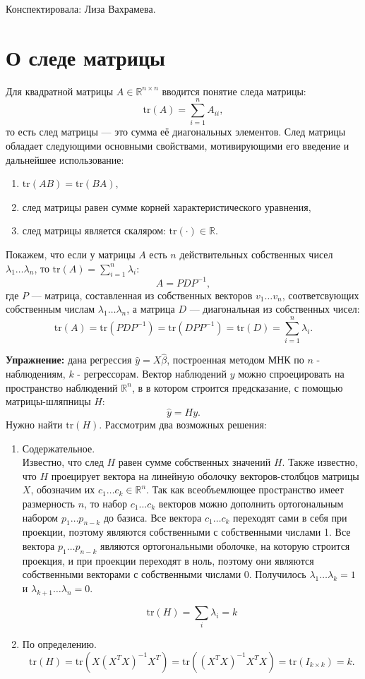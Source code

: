 \documentclass[12pt]{article} %
\theoremstyle{definition} %
\begin{document}
Конспектировала: Лиза Вахрамева.

\section{О следе матрицы}
Для квадратной матрицы $A \in \mathbb{R}^{n \times n}$ вводится понятие следа
матрицы:
$$\text{tr}(A) = \sum_{i=1}^n A_{ii},$$
то есть след матрицы — это сумма её диагональных элементов. След матрицы обладает следующими основными свойствами, мотивирующими его введение и дальнейшее использование:
\begin{enumerate}
    \item $\text{tr}(AB) = \text{tr}(BA)$,
    \item след матрицы равен сумме корней характеристического уравнения,\\
    \item след матрицы является скаляром: $\text{tr}(\cdot) \in \mathbb{R}$.
\end{enumerate}
Покажем, что если у матрицы $A$ есть $n$ действительных собственных чисел
$\lambda_1 \dots \lambda_n$, то $\text{tr}(A) = \sum_{i=1}^n \lambda_i$:
$$A = PDP^{-1},$$
где $P$ — матрица, составленная из собственных векторов $v_1 \dots v_n$, соответсвующих собственным числам $\lambda_1 \dots \lambda_n$, а матрица
$D$ — диагональная из собственных чисел:
$$\text{tr}(A) = \text{tr}(PDP^{-1}) = \text{tr}(D PP^{-1})
= \text{tr}(D) = \sum_{i=1}^n \lambda_i.$$

\textbf{Упражнение:} дана регрессия $\hat{y} = X\hat{\beta}$, построенная методом МНК по $n$ - наблюдениям, $k$ - регрессорам. Вектор наблюдений $y$ можно спроецировать на пространство наблюдений $\mathbb{R}^n$, в в котором строится предсказание, с помощью матрицы-шляпницы $H$:
$$\hat{y} = Hy.$$
Нужно найти $\text{tr}(H)$. Рассмотрим два возможных решения:
\begin{enumerate}
    \item Содержательное. \\
    Известно, что след $H$ равен сумме собственных значений $H$. Также известно, что  $H$ проецирует вектора на линейную оболочку векторов-столбцов матрицы $X$, обозначим их $c_1 \dots c_k \in \mathbb{R}^n$. Так как всеобъемлющее пространство имеет размерность $n$, то набор $c_1 \dots c_k$ векторов можно дополнить ортогональным набором $p_1 \dots p_{n-k}$ до базиса. Все вектора $c_1 \dots c_k$ переходят сами в себя при проекции, поэтому являются собственными с собственными числами 1. Все вектора $p_1 \dots p_{n-k}$
    являются ортогональными оболочке, на которую строится проекция, и при проекции переходят в ноль, поэтому они являются собственными векторами с собственными числами 0. Получилось $\lambda_1 \dots \lambda_k = 1$ и $\lambda_{k+1} \dots \lambda_n = 0$.

    $$\text{tr}(H) = \sum_i \lambda_i = k$$

    \item По определению.
    $$ \text{tr}(H) = \text{tr} (X(X^TX)^{-1}X^T) =
      \text{tr} ((X^TX)^{-1} X^TX) = \text{tr} (I_{k \times k}) = k.$$
\end{enumerate}
\end{document}
